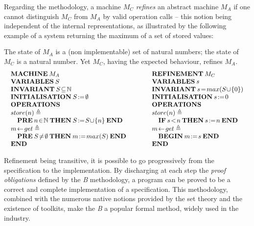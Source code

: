 \documentclass{llncs}
\begin{document}
Regarding the methodology, a machine $M_C$ \emph{refines} an abstract machine $M_A$ if one 
cannot distinguish $M_C$ from $M_A$ by valid operation calls -- this notion being independent 
of the internal representations, as illustrated by the following example of a system returning 
the maximum of a set of stored values:
\begin{example}\small The state of $M_A$ is a (non implementable) set of natural numbers; the 
state of $M_C$ is a natural number. Yet $M_C$, having the expected behaviour, refines $M_A$.
\[
\begin{array}{lll}
\begin{array}{l}
\Bcmd{MACHINE}\:M_A\\
\Bcmd{VARIABLES}\:S\\
\Bcmd{INVARIANT}\:S\!\subseteq\!\NAT\\
\Bcmd{INITIALISATION}\:S\!:=\!\emptyset\\
\Bcmd{OPERATIONS}\\
store(n)\triangleq\\
\quad\Bcmd{PRE}\:n\!\in\!\NAT\:\Bcmd{THEN}\:S\!:=\!S\!\cup\!\{n\}\:\Bcmd{END}\\
m\!\gets\!get\triangleq\\
\quad\Bcmd{PRE}\:S\!\not=\!\emptyset\:\Bcmd{THEN}\:m\!:=\!max(S)\:\Bcmd{END}\\
\Bcmd{END}
\end{array}
& \quad &
\begin{array}{l}
\Bcmd{REFINEMENT}\:M_C\\
\Bcmd{VARIABLES}\:s\\
\Bcmd{INVARIANT}\:s\!=\!max(S\!\cup\!\{0\})\\
\Bcmd{INITIALISATION}\:s\!:=\!0\\
\Bcmd{OPERATIONS}\\
store(n)\triangleq\\
\quad\Bcmd{IF}\:s\!<\!n\:\Bcmd{THEN}\:s\!:=\!n\:\Bcmd{END}\\
m\!\gets\!get\triangleq\\
\quad\Bcmd{BEGIN}\:m\!:=\!s\:\Bcmd{END}\\
\Bcmd{END}
\end{array}
\end{array}
\]
\end{example}
Refinement being transitive, it is possible to go progressively from the specification to the 
implementation. By discharging at each step the \emph{proof obligations} defined by the 
\emph{B} methodology, a program can be proved to be a correct and complete implementation of a 
specification. This methodology, combined with the numerous native notions provided by the set 
theory and the existence of toolkits, make the \emph{B} a popular formal method, widely used 
in the industry.
\end{document}
